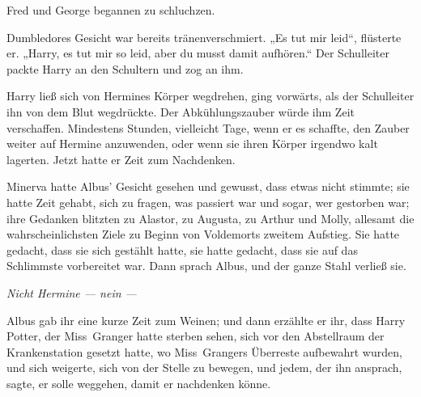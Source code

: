 Fred und George begannen zu schluchzen.

Dumbledores Gesicht war bereits tränenverschmiert.
„Es tut mir leid“, flüsterte er.
„Harry, es tut mir so leid, aber du musst damit aufhören.“ Der Schulleiter packte Harry an den Schultern und zog an ihm.


Harry ließ sich von Hermines Körper wegdrehen, ging vorwärts, als der Schulleiter ihn von dem Blut wegdrückte. Der Abkühlungszauber würde ihm Zeit verschaffen. Mindestens Stunden, vielleicht Tage, wenn er es schaffte, den Zauber weiter auf Hermine anzuwenden, oder wenn sie ihren Körper irgendwo kalt lagerten. Jetzt hatte er Zeit zum Nachdenken.

\later


Minerva hatte Albus’ Gesicht gesehen und gewusst, dass etwas nicht stimmte; sie hatte Zeit gehabt, sich zu fragen, was passiert war und sogar, wer gestorben war; ihre Gedanken blitzten zu Alastor, zu Augusta, zu Arthur und Molly, allesamt die wahrscheinlichsten Ziele zu Beginn von Voldemorts zweitem Aufstieg. Sie hatte gedacht, dass sie sich gestählt hatte, sie hatte gedacht, dass sie auf das Schlimmste vorbereitet war. Dann sprach Albus, und der ganze Stahl verließ sie.

\emph{Nicht Hermine — nein —}

Albus gab ihr eine kurze Zeit zum Weinen; und dann erzählte er ihr, dass Harry Potter, der Miss~Granger hatte sterben sehen, sich vor den Abstellraum der Krankenstation gesetzt hatte, wo Miss~Grangers Überreste aufbewahrt wurden, und sich weigerte, sich von der Stelle zu bewegen, und jedem, der ihn ansprach, sagte, er solle weggehen, damit er nachdenken könne.

